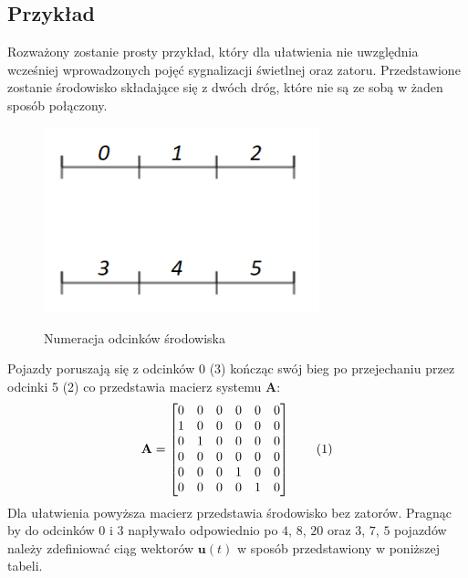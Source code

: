 \documentclass[12pt]{book}
\theoremstyle{plain}
\newcommand\addtag{\refstepcounter{equation}
\renewcommand{\labelenumii}{\theenumii}
\renewcommand{\theenumii}{\theenumi.\arabic{enumii}.}
\tag{\theequation}}
\begin{document}
\subsection*{Przykład}
Rozważony zostanie prosty przykład, który dla ułatwienia nie uwzględnia wcześniej wprowadzonych pojęć sygnalizacji świetlnej oraz zatoru. Przedstawione zostanie środowisko składające się z dwóch dróg, które nie są ze sobą w żaden sposób połączony.
\begin{figure}[H]
	\centering
	\includegraphics[width=8cm]{images/env_12_italic2}
	\label{fig:env_12}
	\caption{Numeracja odcinków środowiska}
\end{figure} \noindent
Pojazdy poruszają się z odcinków 0 (3) kończąc swój bieg po przejechaniu przez odcinki 5 (2) co przedstawia macierz systemu $\textbf{A}$:
\def \A{\begin{bmatrix}
0 & 0 & 0 & 0 & 0 & 0 \\
1 & 0 & 0 & 0 & 0 & 0 \\
0 & 1 & 0 & 0 & 0 & 0 \\
0 & 0 & 0 & 0 & 0 & 0 \\
0 & 0 & 0 & 1 & 0 & 0 \\
0 & 0 & 0 & 0 & 1 & 0
\end{bmatrix}}
\[\textbf{A}=\A \addtag \]
Dla ułatwienia powyższa macierz przedstawia środowisko bez zatorów.
Pragnąc by do odcinków $0$ i $3$  napływało odpowiednio po $4$, $8$, $20$ oraz $3$, $7$, $5$ pojazdów należy zdefiniować ciąg wektorów $\textbf{u}(t)$ w sposób przedstawiony w poniższej tabeli. \newline
\end{document}
